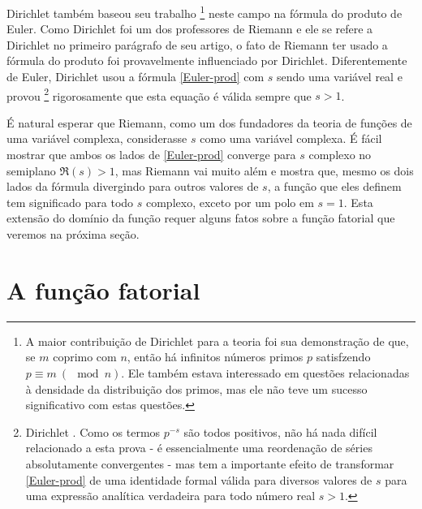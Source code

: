     Dirichlet também baseou seu trabalho
    \footnote{A maior contribuição de Dirichlet para a teoria foi sua demonstração de que, se $m$ coprimo com $n$, então há infinitos números primos $p$ satisfzendo $p \equiv m \ (\mod n)$. Ele também estava interessado em questões relacionadas à densidade da distribuição dos primos, mas ele não teve um sucesso significativo com estas questões. 
    }
    neste campo na fórmula do produto de Euler. Como Dirichlet foi um dos professores de Riemann e ele se refere a Dirichlet no primeiro parágrafo de seu artigo, o fato de Riemann ter usado a fórmula do produto foi provavelmente influenciado por Dirichlet. Diferentemente de Euler, Dirichlet usou a fórmula \eqref{Euler-prod} com $s$ sendo uma variável real e provou
    \footnote{Dirichlet \cite{Dirichlet38}. Como os termos $p^{-s}$ são todos positivos, não há nada difícil relacionado a esta prova - é essencialmente uma reordenação de séries absolutamente convergentes - mas tem a importante efeito de transformar \eqref{Euler-prod} de uma identidade formal válida  para diversos valores de $s$ para uma expressão analítica verdadeira para todo número real $s>1$.
    }
    rigorosamente que esta equação é válida sempre que $s>1$.
    
    É natural esperar que Riemann, como um dos fundadores da teoria de funções de uma variável complexa, considerasse $s$ como uma variável complexa. É fácil mostrar que ambos os lados de \eqref{Euler-prod} converge para $s$ complexo no semiplano $\Re(s)>1$, mas Riemann vai muito além e mostra que, mesmo os dois lados da fórmula divergindo para outros valores de $s$, a função que eles definem tem significado para todo $s$ complexo, exceto por um polo em $s=1$. Esta extensão do domínio da função requer alguns fatos sobre a função fatorial que veremos na próxima seção.
    
    
    \section{A função fatorial}
    

